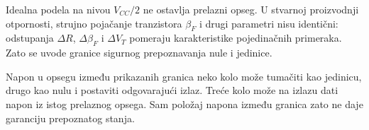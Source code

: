 Idealna podela na nivou $V_{CC}/2$ ne ostavlja prelazni opseg. U stvarnoj proizvodnji otpornosti, strujno pojačanje tranzistora $\beta_F$ i drugi parametri nisu identični: odstupanja $\Delta R$, $\Delta\beta_F$ i $\Delta V_T$ pomeraju karakteristike pojedinačnih primeraka. Zato se uvode granice sigurnog prepoznavanja nule i jedinice.

Napon u opsegu između prikazanih granica neko kolo može tumačiti kao jedinicu, drugo kao nulu i postaviti odgovarajući izlaz. Treće kolo može na izlazu dati napon iz istog prelaznog opsega. Sam položaj napona između granica zato ne daje garanciju prepoznatog stanja.
